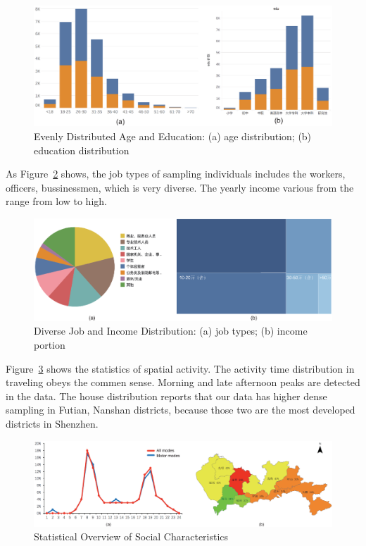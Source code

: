 \begin{figure}[htb!]
 \centering %
 \includegraphics[width=\columnwidth]{pictures/data1}
 \caption{Evenly Distributed Age and Education: (a) age distribution; (b) education distribution}
 \label{fig:data_age_edu}
\end{figure}

As Figure~\ref{fig:data_job_inc} shows, the job types of sampling individuals includes the workers, officers, bussinessmen, which is very diverse. The yearly income various from the range from low to high.

\begin{figure}[htb!]
 \centering %
 \includegraphics[width=\columnwidth]{pictures/data2}
 \caption{Diverse Job and Income Distribution: (a) job types; (b) income portion}
 \label{fig:data_job_inc}
\end{figure}


Figure~\ref{fig:data_geometry} shows the statistics of spatial activity. The activity time distribution in traveling obeys the commen sense. Morning and late afternoon peaks are detected in the data. The house distribution reports that our data has higher dense sampling in Futian, Nanshan districts, because those two are the most developed districts in Shenzhen.  



\begin{figure}[htb!]
 \centering %
 \includegraphics[width=\columnwidth]{pictures/data3}
 \caption{Statistical Overview of Social Characteristics}
 \label{fig:data_geometry}
\end{figure}



